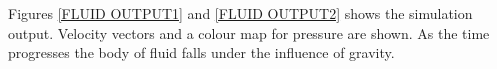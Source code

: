 Figures \ref{FLUID OUTPUT1} and \ref{FLUID OUTPUT2} shows the simulation output. Velocity vectors and a colour map for pressure are shown. As the time progresses the body of fluid falls under the influence of gravity. 
% 
\begin{figure}[ht]
\center
{}

\end{figure}
